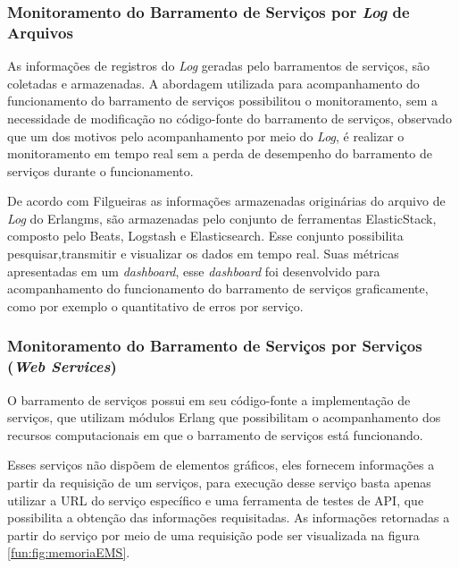 \subsubsection{Monitoramento do Barramento de Serviços por \textit{Log} de Arquivos}

As informações de registros do \textit{Log} geradas pelo barramentos de serviços, são coletadas e armazenadas. A abordagem utilizada para acompanhamento do funcionamento do barramento de serviços possibilitou o monitoramento, sem a necessidade de modificação no código-fonte do barramento de serviços, observado que um dos motivos pelo acompanhamento por meio do \textit{Log}, é realizar o monitoramento em tempo real sem a perda de desempenho  do barramento de serviços durante o funcionamento. 

De acordo com Filgueiras\cite{filgueirasmonitoramento}  as informações armazenadas originárias do arquivo de \textit{Log} do Erlangms, são armazenadas pelo conjunto de ferramentas ElasticStack, composto pelo Beats, Logstash e Elasticsearch. Esse conjunto possibilita pesquisar,transmitir e visualizar os dados em tempo real\cite{filgueirasmonitoramento}. Suas métricas apresentadas em um \textit{dashboard}, esse \textit{dashboard} foi desenvolvido para acompanhamento do funcionamento do barramento de serviços graficamente, como por exemplo o quantitativo de erros por serviço.



\subsubsection{Monitoramento do Barramento de Serviços por Serviços (\textit{Web Services})}
O barramento de serviços possui em seu código-fonte a implementação de serviços, que utilizam módulos Erlang que possibilitam o acompanhamento dos recursos computacionais em que o barramento de serviços está funcionando. 

Esses serviços não dispõem de elementos gráficos, eles fornecem informações a partir da requisição de um serviços, para execução desse serviço basta apenas utilizar a \acrshort{URL} do serviço específico e uma ferramenta de testes de \acrshort{API}, que possibilita a obtenção das informações requisitadas. As informações retornadas a partir do serviço por meio de uma requisição pode ser visualizada na figura \ref{fun:fig:memoriaEMS}.

